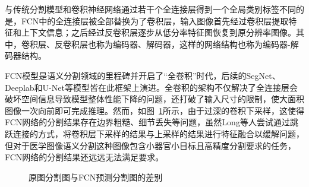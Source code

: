 与传统分割模型和卷积神经网络通过若干个全连接层得到一个全局类别标签不同的是，FCN中的全连接层被全部替换为了卷积层，输入图像首先经过卷积层提取特征和上下文信息；之后经过反卷积层逐步从低分率特征图恢复到原分辨率图像。其中，卷积层、反卷积层也称为编码器、解码器，这样的网络结构也称为编码器-解码器结构。

FCN模型是语义分割领域的里程碑并开启了“全卷积”时代，后续的SegNet、Deeplab和U-Net等模型皆在此框架上演进。全卷积的架构不仅解决了全连接层会破坏空间信息导致模型整体性能下降的问题，还打破了输入尺寸的限制，使大面积图像一次向前即可完成推理。然而，如图~\ref{fig:fcn_pre}所示，由于过深的卷积下采样，这使得FCN网络的分割结果存在边界粗糙、细节丢失等问题，虽然Long等人尝试通过跳跃连接的方式，将卷积层下采样的结果与上采样的结果进行特征融合以缓解问题，但对于医学图像语义分割这种图像包含小器官小目标且高精度分割要求的任务，FCN网络的分割结果还远远无法满足要求。

\begin{figure}[htbp]
    \centering
    \caption{原图分割图与FCN预测分割图的差别\cite{shelhamer2016}}
    \label{fig:fcn_pre}
\end{figure}

